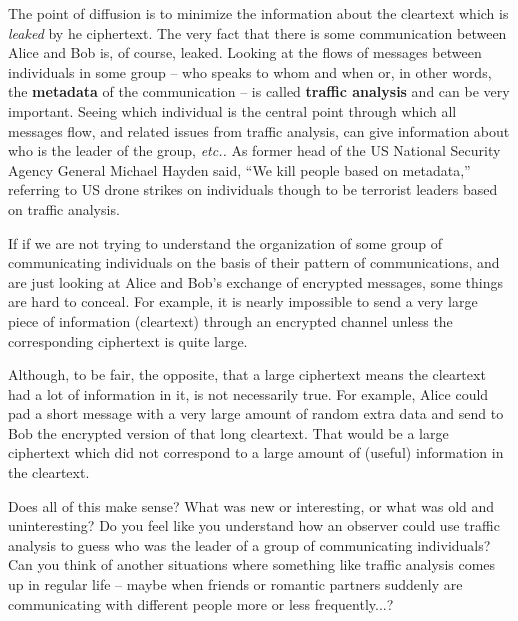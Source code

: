 \documentclass[12pt,letterpaper]{amsbook}
\theoremstyle{definition}
\theoremstyle{remark}
\numberwithin{figure}{section}
\numberwithin{exercise}{chapter}
\numberwithin{section}{chapter}
\numberwithin{equation}{section}
\numberwithin{table}{subsection}
\newcommand{\ix}[1]{{#1}\index{#1}}
\begin{document}
The point of \ix{diffusion} is to minimize the information about the
cleartext which is \textit{leaked} by he ciphertext.
The very fact that there is some communication between Alice and Bob is, of
course, leaked.  Looking at the flows of messages between individuals in some
group -- who speaks to whom and when or, in other words, the
\textbf{\ix{metadata}} of the communication -- is called
\textbf{\ix{traffic analysis}} and can be very important. Seeing which
individual is the central point through which all messages flow,
and related issues from traffic analysis, can give information about who is
the leader of the group, \textit{etc..}  As former head of the US National
Security Agency General Michael Hayden said\cite{cole2014we}, ``We kill
people based on metadata,''  referring to US drone
strikes on individuals though to be terrorist leaders
based on traffic analysis.

If if we are not trying to understand the organization of some group of
communicating individuals on the basis of their pattern of communications, and
are just looking at Alice and Bob's exchange of encrypted messages, some
things are hard to conceal.  For example, it is nearly impossible to send a
very large piece of information (cleartext) through an encrypted channel
unless the corresponding ciphertext is quite large.

Although, to be fair, the opposite, that a large ciphertext means the
cleartext had a lot of information in it, is not necessarily true.  For
example, Alice could pad a short message with a very large amount of random
extra data and send to Bob the encrypted version of that long cleartext.
That would be a large ciphertext which did not correspond to a large amount of
(useful) information in the cleartext.

\vskip2mm
\begin{AZtcb}[label=az:trafficanalysis]{}{}
  Does all of this make sense?  What was new or interesting, or what was old
  and uninteresting?  Do you feel like you understand how an observer could
  use traffic analysis to guess who was the leader of a group of communicating
  individuals?  Can you think of another situations where something like
  traffic analysis comes up in regular life -- maybe when friends or romantic
  partners suddenly are communicating with different people more or less
  frequently...?
\end{AZtcb}
\end{document}
